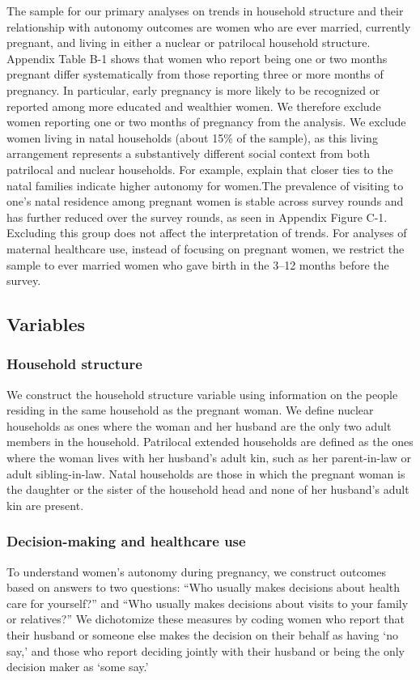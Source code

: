 \documentclass[12pt]{article}
\begin{document}
The sample for our primary analyses on trends in household structure and their relationship with autonomy outcomes are women who are ever married, currently pregnant, and living in either a nuclear or patrilocal household structure. Appendix Table B-1 shows that women who report being one or two months pregnant differ systematically from those reporting three or more months of pregnancy. In particular, early pregnancy is more likely to be recognized or reported among more educated and wealthier women. We therefore exclude women reporting one or two months of pregnancy from the analysis. We exclude women living in natal households (about 15\% of the sample), as this living arrangement represents a substantively different social context from both patrilocal and nuclear households. For example, \cite{dyson1983kinship} explain that closer ties to the natal families indicate higher autonomy for women.The prevalence of visiting to one's natal residence among pregnant women is stable across survey rounds and has further reduced over the survey rounds, as seen in Appendix Figure C-1.  Excluding this group does not affect the interpretation of trends. For analyses of maternal healthcare use, instead of focusing on pregnant women, we restrict the sample to ever married women who gave birth in the 3--12 months before the survey.

\subsection*{Variables}

\subsubsection*{Household structure} \label{sec:def_hhstruc}
We construct the household structure variable using information on the people residing in the same household as the pregnant woman. We define nuclear households as ones where the woman and her husband are the only two adult members in the household. Patrilocal extended households are defined as the ones where the woman lives with her husband’s adult kin, such as her parent-in-law or adult sibling-in-law. Natal households are those in which the pregnant woman is the daughter or the sister of the household head and none of her husband’s adult kin are present. 

\subsubsection*{Decision-making and healthcare use} \label{sec:outcomes}
To understand women's autonomy during pregnancy, we construct outcomes based on answers to two questions: ``Who usually makes decisions about health care for yourself?'' and ``Who usually makes decisions about visits to your family or relatives?'' We dichotomize these measures by coding women who report that their husband or someone else makes the decision on their behalf as having ‘no say,’ and those who report deciding jointly with their husband or being the only decision maker as ‘some say.’
\end{document}
